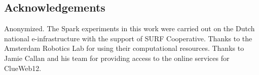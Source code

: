 \documentclass[sigconf,anonymous]{acmart}
\begin{document}


\maketitle






%


\subsection*{Acknowledgements}
Anonymized.
The Spark experiments in this work were carried out on the Dutch national e-infrastructure with the support of SURF Cooperative. Thanks to the Amsterdam Robotics Lab for using their computational resources. Thanks to Jamie Callan and his team for providing access to the online services for ClueWeb12. 
\fi


 
\end{document}
